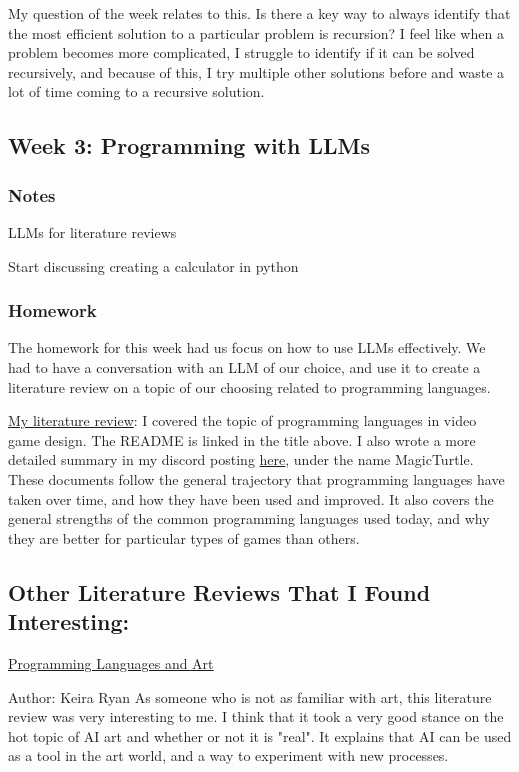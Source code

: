 \documentclass{article}
\theoremstyle{theorem}
\theoremstyle{definition}
\theoremstyle{remark}
\begin{document}
My question of the week relates to this. Is there a key way to always identify that the most efficient solution to
a particular problem is recursion? I feel like when a problem becomes more complicated, I struggle to identify if 
it can be solved recursively, and because of this, I try multiple other solutions before and waste a lot of time
coming to a recursive solution.

\subsection{Week 3: Programming with LLMs}
\subsubsection*{Notes}
LLMs for literature reviews 

Start discussing creating a calculator in python
\subsubsection*{Homework}

The homework for this week had us focus on how to use LLMs effectively. We had to have
a conversation with an LLM of our choice, and use it to create a literature review
on a topic of our choosing related to programming languages. 

\href{https://github.com/egarof00/CPSC354-HW3}{My literature review}:
I covered the topic of programming languages in video game design. The README is linked in the title above. 
I also wrote a more detailed summary in my discord posting \href{https://discord.com/channels/1277862531226013750/1278164700076707892/1285026014057070632}{here},
under the name MagicTurtle. These documents follow the general trajectory that programming languages have taken over time, and how
they have been used and improved. It also covers the general strengths of the common programming languages used today, and why
they are better for particular types of games than others.

\subsection*{Other Literature Reviews That I Found Interesting:}
\href{https://github.com/keira-ryan/question/blob/main/README.md}{Programming Languages and Art}

Author: Keira Ryan 
As someone who is not as familiar with art, this literature review was very interesting to me.
I think that it took a very good stance on the hot topic of AI art and whether or not
it is "real". It explains that AI can be used as a tool in the art world, and a way to 
experiment with new processes. 
\end{document}
